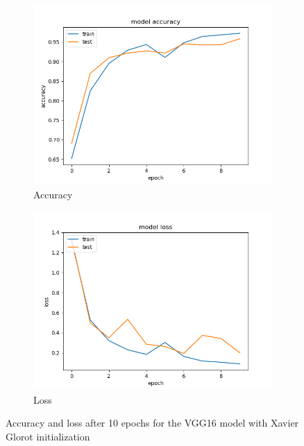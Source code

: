 \documentclass{article}
\theoremstyle{definition}
\theoremstyle{remark}
\begin{document}
\begin{figure}[h!]
\centering
\begin{subfigure}{.5\textwidth}
  \centering
  \includegraphics[width=1.2\linewidth]{img/from_scratch_models/vgg16_acc.png}
  \caption{Accuracy}
  \label{fig:sub1}
\end{subfigure}%
\begin{subfigure}{.5\textwidth}
  \centering
  \includegraphics[width=1.2\linewidth]{img/from_scratch_models/vgg16_loss.png}
  \caption{Loss}
  \label{fig:sub2}
\end{subfigure}
\caption{Accuracy and loss after 10 epochs for the VGG16 model with Xavier Glorot initialization}
\label{fig:vgg16_ten_epochs_xavier}
\end{figure}
\end{document}

